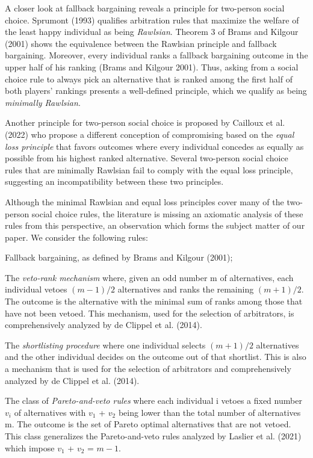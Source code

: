 \documentclass[version=3.21, pagesize, twoside=off, bibliography=totoc, DIV=calc, fontsize=12pt, a4paper]{scrartcl}
\begin{document}
A closer look at fallback bargaining reveals a principle for two-person social choice. Sprumont (1993) qualifies arbitration rules that maximize the welfare of the least happy individual as being \textit{Rawlsian}. Theorem 3 of Brams and Kilgour (2001) shows the equivalence between the Rawlsian principle and fallback bargaining. Moreover, every individual ranks a fallback bargaining outcome in the upper half of his ranking (Brams and Kilgour 2001). Thus, asking from a social choice rule to always pick an alternative that is ranked among the first half of both players’ rankings presents a well-defined principle, which we qualify as being \textit{minimally Rawlsian}. 

Another principle for two-person social choice is proposed by Cailloux et al. (2022) who propose a different conception of compromising based on the \textit{equal loss principle} that favors outcomes where every individual concedes as equally as possible from his highest ranked alternative. Several two-person social choice rules that are minimally Rawlsian fail to comply with the equal loss principle, suggesting an incompatibility between these two principles.
 
Although the minimal Rawlsian and equal loss principles cover many of the two-person social choice rules, the literature is missing an axiomatic analysis of these rules from this perspective, an observation which forms the subject matter of our paper. We consider the following rules:

Fallback bargaining, as defined by Brams and Kilgour (2001);

The \textit{veto-rank mechanism} where, given an odd number m of alternatives, each individual vetoes $(m−1) / 2$ alternatives and ranks the remaining $(m+1) / 2$. The outcome is the alternative with the minimal sum of ranks among those that have not been vetoed. This mechanism, used for the selection of arbitrators, is comprehensively analyzed by de Clippel et al. (2014).


The \textit{shortlisting procedure} where one individual selects $(m+1) / 2$ alternatives and the other individual decides on the outcome out of that shortlist. This is also a mechanism that is used for the selection of arbitrators and comprehensively analyzed by de Clippel et al. (2014).


The class of \textit{Pareto-and-veto rules} where each individual i vetoes a fixed number $v_i$ of alternatives with $v_1$ + $v_2$ being lower than the total number of alternatives m. The outcome is the set of Pareto optimal alternatives that are not vetoed. This class generalizes the Pareto-and-veto rules analyzed by Laslier et al. (2021) which impose $v_1$ + $v_2$ = $m-1$.
  
\end{document}
